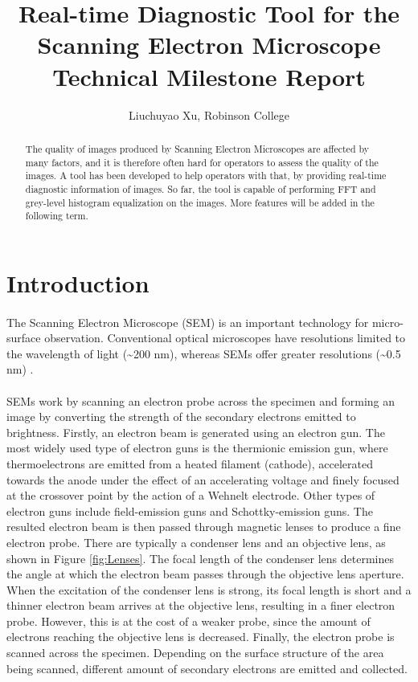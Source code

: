\documentclass[12pt,a4paper]{article}
\title{Real-time Diagnostic Tool for the Scanning Electron Microscope Technical Milestone Report}
\author{Liuchuyao Xu, Robinson College}
\affil{Supervisor: Dr David Holburn}
\begin{document}
\maketitle

\begin{abstract}
The quality of images produced by Scanning Electron Microscopes are affected by many factors, and it is therefore often hard for operators to assess the quality of the images. A tool has been developed to help operators with that, by providing real-time diagnostic information of images. So far, the tool is capable of performing FFT and grey-level histogram equalization on the images. More features will be added in the following term.
\end{abstract}

\section{Introduction}
\paragraph{}
The Scanning Electron Microscope (SEM) is an important technology for micro-surface observation. Conventional optical microscopes have resolutions limited to the wavelength of light (\textasciitilde 200 nm), whereas SEMs offer greater resolutions (\textasciitilde 0.5 nm) \cite{JEOL}.

\paragraph{}
SEMs work by scanning an electron probe across the specimen and forming an image by converting the strength of the secondary electrons emitted to brightness. Firstly, an electron beam is generated using an electron gun. The most widely used type of electron guns is the thermionic emission gun, where thermoelectrons are emitted from a heated filament (cathode), accelerated towards the anode under the effect of an accelerating voltage and finely focused at the crossover point by the action of a Wehnelt electrode. Other types of electron guns include field-emission guns and Schottky-emission guns. The resulted electron beam is then passed through magnetic lenses to produce a fine electron probe. There are typically a condenser lens and an objective lens, as shown in Figure \ref{fig:Lenses}. The focal length of the condenser lens determines the angle at which the electron beam passes through the objective lens aperture. When the excitation of the condenser lens is strong, its focal length is short and a thinner electron beam arrives at the objective lens, resulting in a finer electron probe. However, this is at the cost of a weaker probe, since the amount of electrons reaching the objective lens is decreased. Finally, the electron probe is scanned across the specimen. Depending on the surface structure of the area being scanned, different amount of secondary electrons are emitted and collected.
\end{document}
